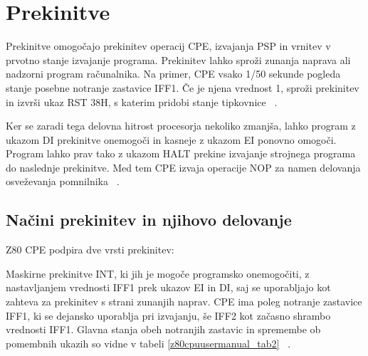 \documentclass[a4paper, 12pt, openright]{book}
\begin{document}
    \section{Prekinitve}

    Prekinitve omogočajo prekinitev operacij CPE, izvajanja PSP in vrnitev v
    prvotno stanje izvajanje programa. Prekinitev lahko sproži zunanja naprava ali
    nadzorni program računalnika. Na primer, CPE vsako 1/50 sekunde pogleda stanje
    posebne notranje zastavice IFF1. Če je njena vrednost 1, sproži prekinitev in
    izvrši ukaz RST 38H, s katerim pridobi stanje tipkovnice ~\cite{strojnijezikzaprocesorz80,
    z80cpuusermanual}.

    Ker se zaradi tega delovna hitrost procesorja nekoliko zmanjša, lahko
    program z ukazom DI prekinitve onemogoči in kasneje z ukazom EI ponovno
    omogoči. Program lahko prav tako z ukazom HALT prekine izvajanje strojnega programa
    do naslednje prekinitve. Med tem CPE izvaja operacije NOP za namen delovanja
    osveževanja pomnilnika ~\cite{strojnijezikzaprocesorz80, z80cpuusermanual}.

    \subsection{Načini prekinitev in njihovo delovanje}

    Z80 CPE podpira dve vrsti prekinitev:

    Maskirne prekinitve INT, ki jih je mogoče programsko onemogočiti, z
    nastavljanjem vrednosti IFF1 prek ukazov EI in DI, saj se uporabljajo kot zahteva
    za prekinitev s strani zunanjih naprav. CPE ima poleg notranje zastavice
    IFF1, ki se dejansko uporablja pri izvajanju, še IFF2 kot začasno shrambo
    vrednosti IFF1. Glavna stanja obeh notranjih zastavic in spremembe ob pomembnih
    ukazih so vidne v tabeli \ref{z80cpuusermanual_tab2} ~\cite{z80cpuusermanual}.
\end{document}
